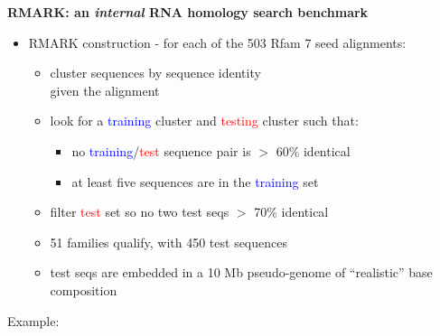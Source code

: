 \documentclass[landscape]{slides}
\begin{document}
\begin{slide}
\begin{center}
\textbf{RMARK: an \emph{internal}  RNA homology search benchmark}
\end{center}
\medskip
\begin{minipage}{7in}
\small
\begin{itemize}
\item
  RMARK construction - for each of the 503 Rfam 7 seed alignments:
  \begin{itemize}
  \item 
    cluster sequences by sequence identity \\ given the alignment
  \item 
    look for a \textcolor{blue}{training} cluster and
    \textcolor{red}{testing} cluster such that: 
    \begin{itemize}
    \item
      no \textcolor{blue}{training}/\textcolor{red}{test} sequence pair is $>$ 60\% identical
    \item
      at least five sequences are in the \textcolor{blue}{training} set
    \end{itemize}
  \item
    filter \textcolor{red}{test} set so no two test seqs $>$ 70\% identical 
  \item
    51 families qualify, with 450 test sequences
  \item
    test seqs are embedded in a 10 Mb pseudo-genome of ``realistic'' base composition
  \end{itemize}
\end{itemize}
\vspace{1.5in}
\end{minipage}
\hspace{0.1in}
\begin{minipage}{3.5in}
  Example: 
\vspace{0.2in}


\end{minipage}
\end{slide}
\end{document}

